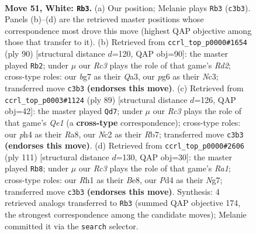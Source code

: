 \documentclass[11pt]{article}
\begin{document}
\clearpage

\begin{figure}[p]\centering
\begin{subfigure}{0.46\textwidth}\centering
\resizebox{\linewidth}{!}{%
\newchessgame
\chessboard[
  setfen={rn1qk1r1/4n1b1/6p1/1p1p2P1/3P1P1p/2R4P/2NQBK2/2B4R w - - 0 51},
  showmover=false,
  pgfstyle=straightmove, color=movearrow, markmove={c3-b3}
]}
\caption{}
\end{subfigure}\hfill
\begin{subfigure}{0.46\textwidth}\centering
\resizebox{\linewidth}{!}{%
\newchessgame
\chessboard[
  setfen={3r1qn1/1r6/R2p2bk/3Pp1p1/6Pp/Q1N2P1P/3R2B1/6K1 w - - 14 46},
  showmover=false,
  pgfstyle=straightmove, color=movearrow, markmove={d2-b2}
]}
\caption{}
\end{subfigure}
\\[4pt]
\begin{subfigure}{0.46\textwidth}\centering
\resizebox{\linewidth}{!}{%
\newchessgame
\chessboard[
  setfen={r3q3/1rn3bk/3p2p1/1p1Pp1Pp/n3P3/P2NB2P/R5K1/1R1N1Q2 b - - 32 45},
  showmover=false,
  pgfstyle=straightmove, color=movearrow, markmove={e8-d7}
]}
\caption{}
\end{subfigure}\hfill
\begin{subfigure}{0.46\textwidth}\centering
\resizebox{\linewidth}{!}{%
\newchessgame
\chessboard[
  setfen={r3b1k1/4q1n1/4p2r/3pP3/8/1P1B1NQP/2N3R1/1K6 b - - 16 56},
  showmover=false,
  pgfstyle=straightmove, color=movearrow, markmove={a8-b8}
]}
\caption{}
\end{subfigure}
\caption{\textbf{Move 51, White: \texttt{Rb3}.} (a) Our position; Melanie plays \texttt{Rb3} (\texttt{c3b3}). Panels (b)--(d) are the retrieved master positions whose correspondence most drove this move (highest QAP objective among those that transfer to it). (b) Retrieved from \texttt{ccrl\_top\_p0000\#1654} (ply 90) [structural distance $d$=120, QAP obj=90]: the master played \texttt{Rb2}; under $\mu$ our \emph{Rc3} plays the role of that game's \emph{Rd2}; cross-type roles: our \emph{b}g7 as their \emph{Q}a3, our \emph{p}g6 as their \emph{N}c3; transferred move \texttt{c3b3} \textbf{(endorses this move)}. (c) Retrieved from \texttt{ccrl\_top\_p0003\#1124} (ply 89) [structural distance $d$=126, QAP obj=42]: the master played \texttt{Qd7}; under $\mu$ our \emph{Rc3} plays the role of that game's \emph{Qe1} (a \textbf{cross-type} correspondence); cross-type roles: our \emph{p}h4 as their \emph{R}a8, our \emph{N}c2 as their \emph{R}b7; transferred move \texttt{c3b3} \textbf{(endorses this move)}. (d) Retrieved from \texttt{ccrl\_top\_p0000\#2606} (ply 111) [structural distance $d$=130, QAP obj=30]: the master played \texttt{Rb8}; under $\mu$ our \emph{Rc3} plays the role of that game's \emph{Ra1}; cross-type roles: our \emph{R}h1 as their \emph{B}e8, our \emph{P}d4 as their \emph{N}g7; transferred move \texttt{c3b3} \textbf{(endorses this move)}. Synthesis: 4 retrieved analogs transferred to \texttt{Rb3} (summed QAP objective 174, the strongest correspondence among the candidate moves); Melanie committed it via the \texttt{search} selector.}
\label{fig:thought-m100}
\end{figure}
\end{document}
